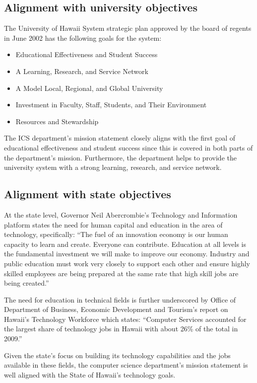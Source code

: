 \documentclass[12pt]{article}
\begin{document}
\subsection{Alignment with university objectives}


The University of Hawaii System strategic plan  approved by the board of regents in June 2002 has the following goals for the system:
\begin{itemize}
\item Educational Effectiveness and Student Success
\item A Learning, Research, and Service Network
\item A Model Local, Regional, and Global University
\item Investment in Faculty, Staff, Students, and Their Environment
\item Resources and Stewardship
\end{itemize}

The ICS department’s mission statement closely aligns with the first goal
of educational effectiveness and student success since this is covered in
both parts of the department’s mission. Furthermore, the department helps
to provide the university system with a strong learning, research, and
service network.

\subsection{Alignment with state objectives}


At the state level, Governor Neil Abercrombie’s Technology and Information
platform states the need for human capital and education in the area of
technology, specifically: “The fuel of an innovation economy is our human
capacity to learn and create. Everyone can contribute. Education at all
levels is the fundamental investment we will make to improve our
economy. Industry and public education must work very closely to support
each other and ensure highly skilled employees are being prepared at the
same rate that high skill jobs are being created.”

The need for education in technical fields is further underscored by Office
of Department of Business, Economic Development and Tourism’s report on
Hawaii’s Technology Workforce which states: “Computer Services accounted
for the largest share of technology jobs in Hawaii with about 26\% of the
total in 2009.”

Given the state's focus on building its technology capabilities and the
jobs available in these fields, the computer science department’s mission
statement is well aligned with the State of Hawaii’s technology goals.
\end{document}

